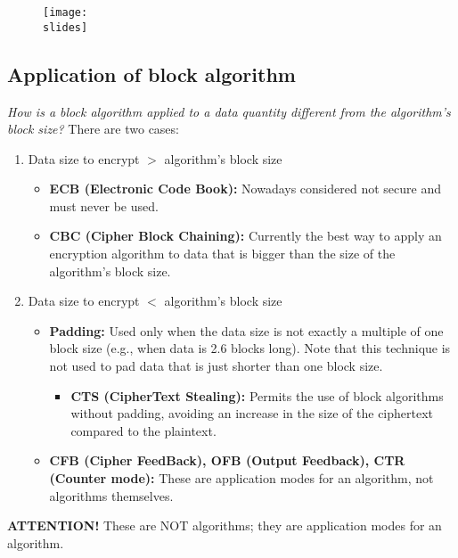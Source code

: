 \begin{figure}[h]
    \centering
    \texttt{[image: \\slides]}
\end{figure}


\newpage
\subsection{Application of block algorithm}

\textit{How is a block algorithm applied to a data quantity different from the algorithm's block size?}
There are two cases:
\begin{enumerate}
    \item Data size to encrypt $>$ algorithm's block size
          \begin{itemize}
              \item \textbf{ECB (Electronic Code Book):} Nowadays considered not secure and must never be used.
              \item \textbf{CBC (Cipher Block Chaining):} Currently the best way to apply an encryption algorithm to data that is bigger than the size of the algorithm's block size.
          \end{itemize}

    \item Data size to encrypt $<$ algorithm's block size
          \begin{itemize}
              \item \textbf{Padding:} Used only when the data size is not exactly a multiple of one block size (e.g., when data is 2.6 blocks long). Note that this technique is not used to pad data that is just shorter than one block size. 
              \begin{itemize}
                \item \textbf{CTS (CipherText Stealing):} Permits the use of block algorithms without padding, avoiding an increase in the size of the ciphertext compared to the plaintext.
              \end{itemize}
              \item \textbf{CFB (Cipher FeedBack), OFB (Output Feedback), CTR (Counter mode):} These are application modes for an algorithm, not algorithms themselves.
          \end{itemize}
\end{enumerate}
\textbf{ATTENTION!} These are NOT algorithms; they are application modes for an algorithm.

